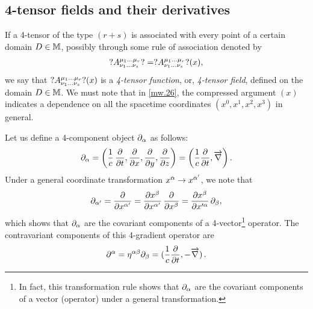 \subsection{4-tensor fields and their 
derivatives}
If a 4-tensor of the type $(r+s)$ is 
associated with every point of a certain domain $D\in 
\mathbb{M}$, possibly through some rule of association denoted 
by
\begin{align}\label{mw.26}
?A^{{{\mu}_1}\dots
{\ensuremath{{\mu}}_r}}_{{{\nu}_1}\dots {\ensuremath{{\nu}}_s}}?=?A^{{{\mu}_1}\dots
{\ensuremath{{\mu}}_r}}_{{{\nu}_1}\dots {\ensuremath{{\nu}}_s}}?(x),
\end{align}
we say that $?A^{{{\mu}_1}\dots 
{\ensuremath{{\mu}}_r}}_{{{\nu}_1}\dots {\ensuremath{{\nu}}_s}}?(x)$ is a 
\textit{4-tensor function}, or, \textit{4-tensor field}, 
defined on the domain $D\in \mathbb{M}$. We must note that in 
\eqref{mw.26}, the compressed argument $(x)$ indicates a 
dependence on all the spacetime coordinates 
$(x^0,x^1,x^2,x^3)$ in general. 

Let us define a 4-component object $ {\partial}_{{\alpha}}$ as follows:
\begin{align}\label{mw.27}
{\ensuremath{\partial}}_{{\alpha}} =\left(\frac{1}{c}\,\frac{{\partial}}{{\partial}
t},\frac{{\partial}}{{\partial} x},\frac{{\partial}}{{\partial} 
y},\frac{{\partial}}{{\partial} z}\right) 
=\left(\frac{1}{c}\frac{{\partial}}{{\partial} t},{\overrightarrow{\nabla} } 
\right).
\end{align}
Under a {general} coordinate transformation $x^{{\alpha}}
\rightarrow {x}^{{\alpha}'}$, we note that
\begin{align*}
{\ensuremath{\partial}}_{{\alpha}'} =\frac{{\partial}}{{\partial} x^{{\alpha}'} }=
\frac{{\partial} x^{{\beta}} }{{\partial} x^{{\alpha}'} }\,
\frac{{\partial}}{{\partial} x^{{\beta}}}=
\frac{{\partial} x^{{\beta}} }{{\partial} x'^{{\alpha}} }\,{\partial}_{{\beta}},
\end{align*}
which shows that ${\partial}_{{\alpha}}$ are the covariant components of 
a 4-vector\footnote{In fact, this transformation rule shows 
that ${\partial}_{{\alpha}}$ are the covariant components of a vector 
(operator) under a general transformation.} operator. The 
contravariant components of this 4-gradient operator are
\begin{align}\label{mw.28}
{\ensuremath{\partial}}^{{\alpha}} =\eta^{{\alpha} {\beta}}{\partial}_{{\beta}}=
(\frac{1}{c}\frac{{\partial}}{{\partial} t},-{\overrightarrow{\nabla} } )\,.
\end{align}

